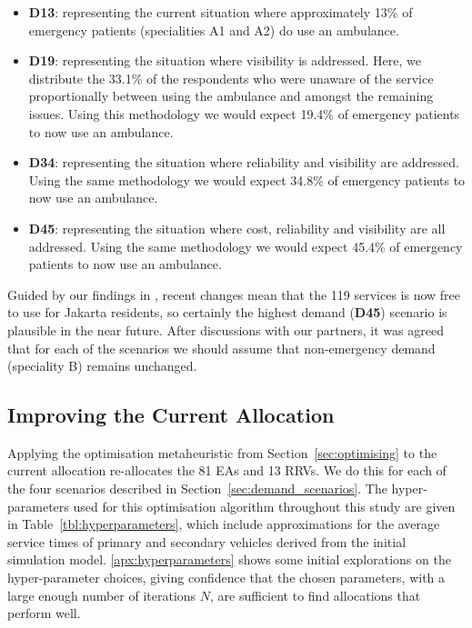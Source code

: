 \documentclass[numbers,webpdf,imaman]{ima-authoring-template}%
\begin{document}
\begin{itemize}
  \item \textbf{D13}: representing the current situation where approximately
        13\% of emergency patients (specialities A1 and A2) do use an ambulance.
  \item \textbf{D19}: representing the situation where visibility is addressed.
        Here, we distribute the 33.1\% of the respondents who were unaware of
        the service proportionally between using the ambulance and amongst the
        remaining issues. Using this methodology we would expect 19.4\% of
        emergency patients to now use an ambulance.  
  \item \textbf{D34}: representing the situation where reliability and
        visibility are addressed. Using the same methodology we would expect
        34.8\% of emergency patients to now use an ambulance.
  \item \textbf{D45}: representing the situation where cost, reliability and
        visibility are all addressed. Using the same methodology we would expect
        45.4\% of emergency patients to now use an ambulance. 
\end{itemize}

Guided by our findings in \citet{BriceSyaribahNoor2022Esui}, recent changes
mean that the 119 services is now free to use for Jakarta residents, so
certainly the highest demand (\textbf{D45}) scenario is plausible in the near
future. After discussions with our partners, it was agreed that for each of
the scenarios we should assume that non-emergency demand (speciality B)
remains unchanged.


\subsection{Improving the Current Allocation}\label{sec:optimise_current}
Applying the optimisation metaheuristic from Section~\ref{sec:optimising} to the
current allocation re-allocates the 81 EAs and 13 RRVs. We do this for each of
the four scenarios described in Section~\ref{sec:demand_scenarios}. The
hyper-parameters used for this optimisation algorithm throughout this study are
given in Table~\ref{tbl:hyperparameters}, which include approximations for the
average service times of primary and secondary vehicles derived from the initial
simulation model. \ref{apx:hyperparameters} shows some initial explorations on
the hyper-parameter choices, giving confidence that the chosen parameters, with
a large enough number of iterations $N$, are sufficient to find allocations
that perform well.
\end{document}
